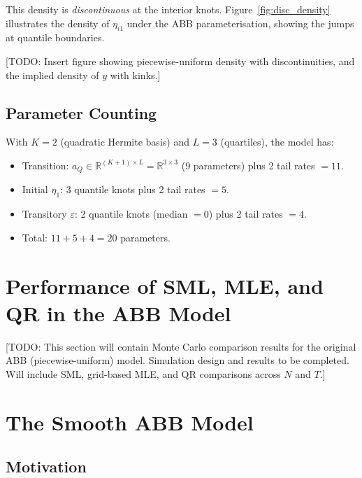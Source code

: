 \documentclass[12pt]{article}
\begin{document}
This density is \emph{discontinuous} at the interior knots.
Figure~\ref{fig:disc_density} illustrates the density of $\eta_{i1}$
under the ABB parameterisation, showing the jumps at quantile boundaries.

\textcolor{myred}{[TODO: Insert figure showing piecewise-uniform density
with discontinuities, and the implied density of $y$ with kinks.]}

\subsection{Parameter Counting}

With $K=2$ (quadratic Hermite basis) and $L=3$ (quartiles), the model has:
\begin{itemize}
\item Transition: $a_Q \in \mathbb{R}^{(K+1) \times L} = \mathbb{R}^{3 \times 3}$
  (9 parameters) plus 2 tail rates $= 11$.
\item Initial $\eta_1$: 3 quantile knots plus 2 tail rates $= 5$.
\item Transitory $\varepsilon$: 2 quantile knots (median $=0$) plus 2 tail rates $= 4$.
\item Total: $11 + 5 + 4 = 20$ parameters.
\end{itemize}

\section{Performance of SML, MLE, and QR in the ABB Model}
\label{sec:mc_abb}

\textcolor{myred}{[TODO: This section will contain Monte Carlo comparison results
for the original ABB (piecewise-uniform) model.
Simulation design and results to be completed.
Will include SML, grid-based MLE, and QR comparisons across $N$ and $T$.]}

\section{The Smooth ABB Model}
\label{sec:smooth}

\subsection{Motivation}
\end{document}
